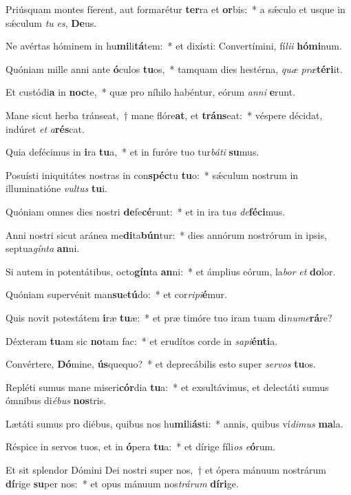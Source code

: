 \item Priúsquam montes fíerent, aut formarétur \textbf{ter}ra et \textbf{or}bis:~* a sǽculo et usque in sǽculum \textit{tu} \textit{es}, \textbf{De}us.
\item Ne avértas hóminem in hu\textbf{mi}li\textbf{tá}tem:~* et dixísti: Convertímini, fí\textit{li}\textit{i} \textbf{hó}\textbf{mi}num.
\item Quóniam mille anni ante \textbf{ó}culos \textbf{tu}os,~* tamquam dies hestérna, \textit{quæ} \textit{præ}\textbf{tér}\textbf{i}it.
\item Et custódi\textbf{a} in \textbf{noc}te,~* quæ pro níhilo habéntur, eórum \textit{an}\textit{ni} \textbf{e}runt.
\item Mane sicut herba tránseat,~† mane flóre\textbf{at}, et \textbf{tráns}eat:~* véspere décidat, indúret \textit{et} \textit{a}\textbf{rés}cat.
\item Quia defécimus in \textbf{i}ra \textbf{tu}a,~* et in furóre tuo tur\textit{bá}\textit{ti} \textbf{su}mus.
\item Posuísti iniquitátes nostras in con\textbf{spéc}tu \textbf{tu}o:~* sǽculum nostrum in illuminatióne \textit{vul}\textit{tus} \textbf{tu}i.
\item Quóniam omnes dies nostri \textbf{de}fe\textbf{cé}runt:~* et in ira tu\textit{a} \textit{de}\textbf{fé}\textbf{ci}mus.
\item Anni nostri sicut aránea me\textbf{di}ta\textbf{bún}tur:~* dies annórum nostrórum in ipsis, septua\textit{gín}\textit{ta} \textbf{an}ni.
\item Si autem in potentátibus, octo\textbf{gín}ta \textbf{an}ni:~* et ámplius eórum, la\textit{bor} \textit{et} \textbf{do}lor.
\item Quóniam supervénit man\textbf{su}e\textbf{tú}do:~* et cor\textit{ri}\textit{pi}\textbf{é}mur.
\item Quis novit potestátem \textbf{i}ræ \textbf{tu}æ:~* et præ timóre tuo iram tuam di\textit{nu}\textit{me}\textbf{rá}re?
\item Déxteram \textbf{tu}am sic \textbf{no}tam fac:~* et erudítos corde in \textit{sa}\textit{pi}\textbf{én}\textbf{ti}a.
\item Convértere, \textbf{Dó}mine, \textbf{ús}quequo?~* et deprecábilis esto super \textit{ser}\textit{vos} \textbf{tu}os.
\item Repléti sumus mane miseri\textbf{cór}dia \textbf{tu}a:~* et exsultávimus, et delectáti sumus ómnibus di\textit{é}\textit{bus} \textbf{nos}tris.
\item Lætáti sumus pro diébus, quibus nos hu\textbf{mi}li\textbf{ás}ti:~* annis, quibus ví\textit{di}\textit{mus} \textbf{ma}la.
\item Réspice in servos tuos, et in \textbf{ó}pera \textbf{tu}a:~* et dírige fíli\textit{os} \textit{e}\textbf{ó}rum.
\item Et sit splendor Dómini Dei nostri super nos,~† et ópera mánuum nostrárum \textbf{dí}rige \textbf{su}per nos:~* et opus mánuum nos\textit{trá}\textit{rum} \textbf{dí}\textbf{ri}ge.
